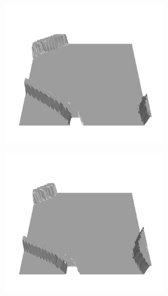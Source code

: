 \documentclass[../document.tex]{subfiles}
\begin{document}
\begin{figure}[h]
\begin{subfigure}[b]{1\textwidth}
\begin{subfigure}[b]{0.19\textwidth}
    \includegraphics[width=\linewidth]{../img/bars1-example-patches/3d/0.png}
    \end{subfigure}
    \begin{subfigure}[b]{0.19\textwidth}
    \includegraphics[width=\linewidth]{../img/bars1-example-patches/3d/2.png}    
    \end{subfigure}  
    \begin{subfigure}[b]{0.19\textwidth}

\end{subfigure}
\end{subfigure}
\end{figure}
\end{document}
